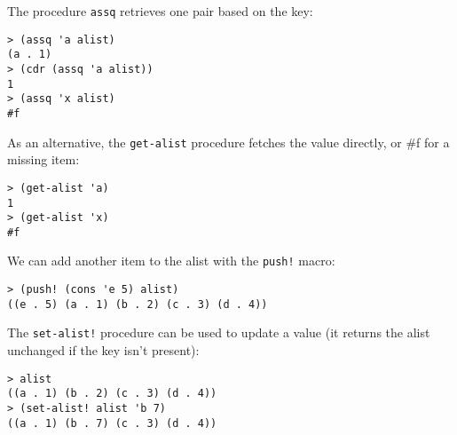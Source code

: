 \documentclass{report}
\begin{document}
{The procedure \texttt{assq} retrieves one pair based on the key:

\noindent\makebox[\linewidth]{\rule{\linewidth}{0.4pt}}
\begin{lstlisting}
> (assq 'a alist)
(a . 1)
> (cdr (assq 'a alist))
1
> (assq 'x alist)
#f
\end{lstlisting}
\noindent\makebox[\linewidth]{\rule{\linewidth}{0.4pt}}

As an alternative, the \texttt{get-alist} procedure fetches the value directly, or \#f for a missing item:

\noindent\makebox[\linewidth]{\rule{\linewidth}{0.4pt}}
\begin{lstlisting}
> (get-alist 'a)
1
> (get-alist 'x)
#f
\end{lstlisting}
\noindent\makebox[\linewidth]{\rule{\linewidth}{0.4pt}}

We can add another item to the alist with the \texttt{push!} macro:

\noindent\makebox[\linewidth]{\rule{\linewidth}{0.4pt}}
\begin{lstlisting}
> (push! (cons 'e 5) alist)
((e . 5) (a . 1) (b . 2) (c . 3) (d . 4))
\end{lstlisting}
\noindent\makebox[\linewidth]{\rule{\linewidth}{0.4pt}}

The \texttt{set-alist!} procedure can be used to update a value (it returns the alist unchanged if the key isn't present):

\noindent\makebox[\linewidth]{\rule{\linewidth}{0.4pt}}
\begin{lstlisting}
> alist
((a . 1) (b . 2) (c . 3) (d . 4))
> (set-alist! alist 'b 7)
((a . 1) (b . 7) (c . 3) (d . 4))
\end{lstlisting}
\noindent\makebox[\linewidth]{\rule{\linewidth}{0.4pt}}

}
\end{document}
